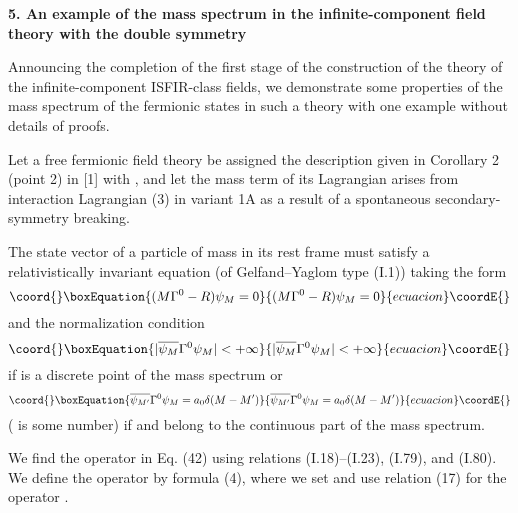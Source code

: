 \documentclass[a4paper,12pt]{article}
\begin{document}
\begin{center}
{\large \bf 5. An example of the mass spectrum in the infinite-component field
theory with the double symmetry}
\end{center}

Announcing the completion of the first stage of the construction of the theory
of the infinite-component ISFIR-class fields, we demonstrate some properties of
the mass spectrum of the fermionic states in such a theory with one example
without details of proofs.

Let a free fermionic field theory be assigned the description given in
Corollary 2 (point 2) in [1] with \coordHE{}, and let the mass term of its
Lagrangian arises from interaction Lagrangian (3) in variant 1A as a result of a
spontaneous secondary-symmetry breaking.

The state vector \coordHE{} of a particle of mass \coordHE{} in its rest frame must
satisfy a relativistically invariant equation (of Gelfand--Yaglom type (I.1))
taking the form
\begin{equation}\coord{}\boxEquation{
(M \Gamma^{0} - R)\psi_{M} = 0
}{
(M \Gamma^{0} - R)\psi_{M} = 0
}{ecuacion}\coordE{}\end{equation}
and the normalization condition
\begin{equation}\coord{}\boxEquation{
|\overline{\psi_{M}} \Gamma^{0} \psi_{M}| < +\infty
}{
|\overline{\psi_{M}} \Gamma^{0} \psi_{M}| < +\infty
}{ecuacion}\coordE{}\end{equation}
if \coordHE{} is a discrete point of the mass spectrum or
\begin{equation}\coord{}\boxEquation{
\overline{\psi_{M'}} \Gamma^{0} \psi_{M} = a_{0}\delta (M-M')
}{
\overline{\psi_{M'}} \Gamma^{0} \psi_{M} = a_{0}\delta (M-M')
}{ecuacion}\coordE{}\end{equation}
(\coordHE{} is some number) if \coordHE{} and \coordHE{} belong to the continuous part of the
mass spectrum.

We find the operator \coordHE{} in Eq. (42) using relations (I.18)--(I.23),
(I.79), and (I.80). We define the operator \coordHE{} by formula (4), where we set
\coordHE{} and use relation (17) for the operator \coordHE{}. 
\end{document}

